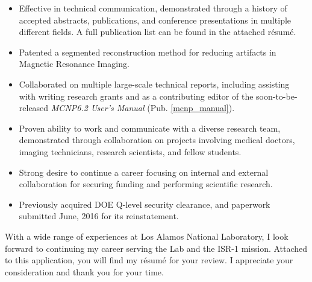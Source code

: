 \begin{center}
\begin{minipage}{\textwidth}
\begin{itemize}[leftmargin=.15in,rightmargin=.25in,itemsep=0.8mm]
	\item Effective in technical communication, demonstrated through a history of accepted abstracts, publications, and conference presentations in multiple different fields. A full publication list can be found in the attached r\'{e}sum\'{e}.
	\item Patented a segmented reconstruction method for reducing artifacts in Magnetic Resonance Imaging.
	\item Collaborated on multiple large-scale technical reports, including assisting with writing research grants and as a contributing editor of the soon-to-be-released \textit{MCNP6.2 User's Manual} (Pub. \ref{mcnp_manual}).
	
	\item Proven ability to work and communicate with a diverse research team, demonstrated through collaboration on projects involving medical doctors, imaging technicians, research scientists, and fellow students.
	\item Strong desire to continue a career focusing on internal and external collaboration for securing funding and performing scientific research.
		
	\item Previously acquired DOE Q-level security clearance, and paperwork submitted June, 2016 for its reinstatement.
  \end{itemize} 

  \vspace{3mm}
  With a wide range of experiences at Los Alamos National Laboratory, I look forward to continuing my career serving the Lab and the ISR-1 mission.
  Attached to this application, you will find my r\'{e}sum\'{e} for your review. I appreciate your consideration and thank you for your time.
  

\end{minipage}
\end{center}
